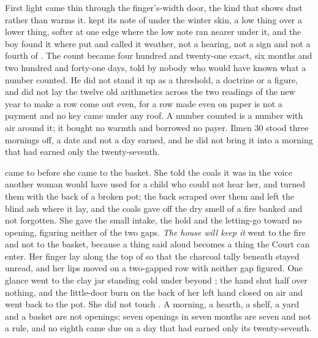 First light came thin through the finger's-width door, the kind that shows dust rather than warms it.  kept its note of  under the winter skin, a low thing over a lower thing, softer at one edge where the low note ran nearer under it, and the boy found it where put and called it weather, not a hearing, not a sign and not a fourth of . The count became four hundred and twenty-one exact, six months and two hundred and forty-one days, told by nobody who would have known what a number counted. He did not stand it up as a threshold, a doctrine or a figure, and did not lay the twelve old arithmetics across the two readings of the new year to make a row come out even, for a row made even on paper is not a payment and no key came under any roof. A number counted is a number with air around it; it bought no warmth and borrowed no payer. Ilmen 30 stood three mornings off, a date and not a day earned, and he did not bring it into a morning that had earned only the twenty-seventh.

\scenebreak

 came to  before she came to the basket. She told the coals it was  in the voice another woman would have used for a child who could not hear her, and turned them with the back of a broken pot; the back scraped over them and left the blind ash where it lay, and the coals gave off the dry smell of a fire banked and not forgotten. She gave the small intake, the hold and the letting-go toward no opening, figuring neither of the two gaps. \emph{The house will keep it} went to the fire and not to the basket, because a thing said aloud becomes a thing the Court can enter. Her finger lay along the top of  so that the charcoal tally beneath stayed unread, and her lips moved on a two-gapped row with neither gap figured. One glance went to the clay jar standing cold under  beyond ; the hand shut half over nothing, and the little-door burn on the back of her left hand closed on air and went back to the pot. She did not touch . A morning, a hearth, a shelf, a yard and a basket are not openings; seven openings in seven months are seven and not a rule, and no eighth came due on a day that had earned only its twenty-seventh.

